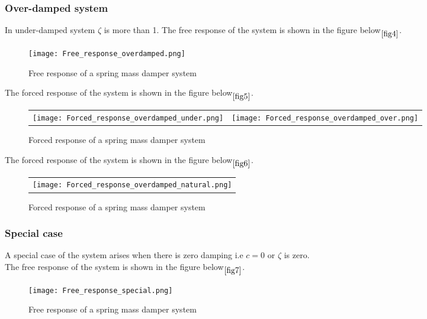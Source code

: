 \documentclass[10pt]{beamer}
\begin{document}
\begin{frame}
\frametitle{Over-damped system}
In under-damped system $\zeta$ is more than 1.
The free response of the system is shown in the figure below$\phantom{}_{\ref{fig4}}$.

\begin{figure}[h]
	\centering
	\texttt{[image: Free\_response\_overdamped.png]}
	\caption{Free response of a spring mass damper system}
\end{figure}
\label{fig4}

\end{frame}


\begin{frame}
The forced response of the system is shown in the figure below$\phantom{}_{\ref{fig5}}$.

\begin{figure}[h]
	\begin{tabular} {l c}
	\texttt{[image: Forced\_response\_overdamped\_under.png]} &
	\texttt{[image: Forced\_response\_overdamped\_over.png]} 
	\end{tabular}
	\caption{Forced response of a spring mass damper system}
\end{figure}
\label{fig5}

\end{frame}
 
\begin{frame}
The forced response of the system is shown in the figure below$\phantom{}_{\ref{fig6}}$.

\begin{figure}[h]
	\begin{tabular} {l}
	\texttt{[image: Forced\_response\_overdamped\_natural.png]} 
	\end{tabular}
	\caption{Forced response of a spring mass damper system}
\end{figure}
\label{fig6} 

\end{frame}


\begin{frame}
\frametitle{Special case}
A special case of the system arises when there is zero damping i.e $c = 0$ or $\zeta$ is zero. \\
The free response of the system is shown in the figure below$\phantom{}_{\ref{fig7}}$.

\begin{figure}[h]
	\centering
	\texttt{[image: Free\_response\_special.png]}
	\caption{Free response of a spring mass damper system}
\end{figure}
\label{fig7}

\end{frame}
\end{document}
